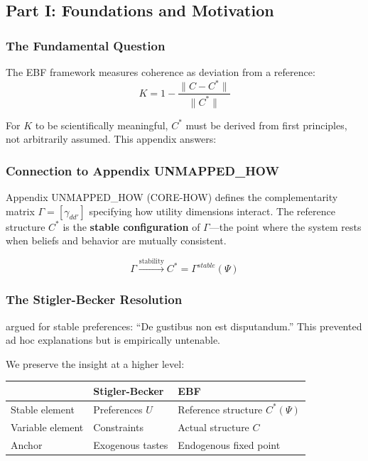 \subsection{Part I: Foundations and Motivation}
\label{sec:D-foundations}

\subsubsection{The Fundamental Question}

The EBF framework measures coherence as deviation from a reference:
\begin{equation}
K = 1 - \frac{\|C - C^*\|}{\|C^*\|}
\end{equation}

For $K$ to be scientifically meaningful, $C^*$ must be derived from first
principles, not arbitrarily assumed. This appendix answers:

\begin{center}
\end{center}

\subsubsection{Connection to Appendix UNMAPPED_HOW}

Appendix UNMAPPED_HOW (CORE-HOW) defines the complementarity matrix $\Gamma = [\gamma_{dd'}]$
specifying how utility dimensions interact. The reference structure $C^*$ is
the \textbf{stable configuration} of $\Gamma$---the point where the system rests
when beliefs and behavior are mutually consistent.

\begin{equation}
\Gamma \xrightarrow{\text{stability}} C^* = \Gamma^{stable}(\Psi)
\end{equation}

\subsubsection{The Stigler-Becker Resolution}

\citet{stiglerbecker1977} argued for stable preferences: ``De gustibus non est
disputandum.'' This prevented ad hoc explanations but is empirically untenable.

We preserve the insight at a higher level:

\begin{center}
\renewcommand{\arraystretch}{1.3}
\begin{tabular}{lll}
\hline
& \textbf{Stigler-Becker} & \textbf{EBF} \\
\hline
Stable element & Preferences $U$ & Reference structure $C^*(\Psi)$ \\
Variable element & Constraints & Actual structure $C$ \\
Anchor & Exogenous tastes & Endogenous fixed point \\
\hline
\end{tabular}
\end{center}

